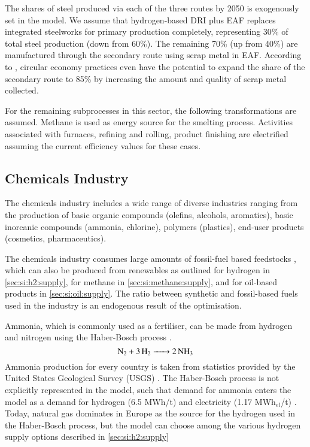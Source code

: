 The shares of steel produced via each of the three routes by 2050 is exogenously
set in the model. We assume that hydrogen-based DRI plus EAF replaces integrated
steelworks for primary production completely, representing 30\% of total steel
production (down from 60\%). The remaining 70\% (up from 40\%) are manufactured
through the secondary route using scrap metal in EAF. According to
, circular economy practices even have the potential to
expand the share of the secondary route to 85\% by increasing the amount and
quality of scrap metal collected.

For the remaining subprocesses in this sector, the following transformations are
assumed. Methane is used as energy source for the smelting process. Activities
associated with furnaces, refining and rolling, product finishing are
electrified assuming the current efficiency values for these cases.

\subsection{Chemicals Industry}
\label{sec:si:industry:chemicals}

The chemicals industry includes a wide range of diverse industries ranging from
the production of basic organic compounds (olefins, alcohols, aromatics), basic
inorcanic compounds (ammonia, chlorine), polymers (plastics), end-user products
(cosmetics, pharmaceutics).

The chemicals industry consumes large amounts of fossil-fuel based feedstocks
, which can also be produced from renewables as
outlined for hydrogen in \cref{sec:si:h2:supply}, for methane in
\cref{sec:si:methane:supply}, and for oil-based products in
\cref{sec:si:oil:supply}. The ratio between synthetic and fossil-based fuels
used in the industry is an endogenous result of the optimisation.

Ammonia, which is commonly used as a fertiliser, can be made from hydrogen and nitrogen using the Haber-Bosch process .
\begin{equation}
    \ce{N2 + 3H2 -> 2NH3}
\end{equation}
Ammonia production for every country is taken from statistics provided by the
United States Geological Survey (USGS) \citeS{}. The Haber-Bosch process is not
explicitly represented in the model, such that demand for ammonia enters the
model as a demand for hydrogen (6.5 MWh/t) and electricity (1.17
MWh$_{el}$/t) . Today, natural gas dominates in
Europe as the source for the hydrogen used in the Haber-Bosch process, but the
model can choose among the various hydrogen supply options described in
\cref{sec:si:h2:supply}

